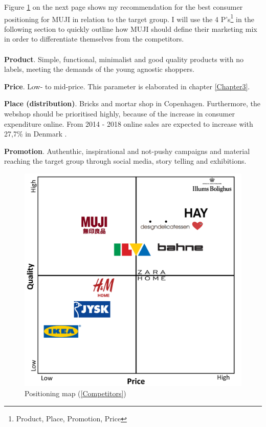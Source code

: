 Figure \ref{PositioningMap} on the next page shows my recommendation for the best consumer positioning for MUJI in relation to the target group. I will use the 4 P's\footnote{Product, Place, Promotion, Price} in the following section to quickly outline how MUJI should define their marketing mix in order to differentiate themselves from the competitors.  
\\\\
\textbf{Product}. Simple, functional, minimalist and good quality products with no labels, meeting the demands of the young agnostic shoppers. 

\textbf{Price}. Low- to mid-price. This parameter is elaborated in chapter \ref{Chapter3}.

\textbf{Place (distribution)}. Bricks and mortar shop in Copenhagen. Furthermore, the webshop should be prioritised highly, because of the increase in consumer expenditure online. From 2014 - 2018 online sales are expected to increase with 27,7\% in Denmark \cite[5]{ConsumerLifestyles}. 

\textbf{Promotion}. Authenthic, inspirational and not-pushy campaigns and material reaching the target group through social media, story telling and exhibitions. 

\begin{figure}[H]
    \centering
    \caption{Positioning map (\ref{Competitors})}
    \label{PositioningMap}
    \includegraphics[width=12 cm]{ConsumerPositioning/CompetitionMapV3.png}
\end{figure}

